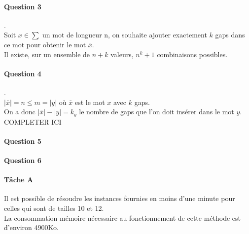 \paragraph{Question 3}.\\
Soit $x \in \sum$ un mot de longueur n, on souhaite ajouter exactement $k$ gaps dans ce mot pour obtenir le mot $\bar x$.\\
Il existe, sur un ensemble de $n + k$ valeurs, $n^k+1$ combinaisons possibles.
\paragraph{Question 4}.\\
$|\bar x| = n \leq m = |y|$ où $\bar x$ est le mot $x$ avec $k$ gaps.\\
On a donc $|\bar x| - |y| = k_y$ le nombre de gaps que l'on doit insérer dans le mot $y$.
COMPLETER ICI
\paragraph{Question 5}
\paragraph{Question 6}
\paragraph{Tâche A}
Il est possible de résoudre les instances fournies en moins d'une minute pour celles qui sont de tailles 10 et 12.\\
La consommation mémoire nécessaire au fonctionnement de cette méthode est d'environ 4900Ko.

